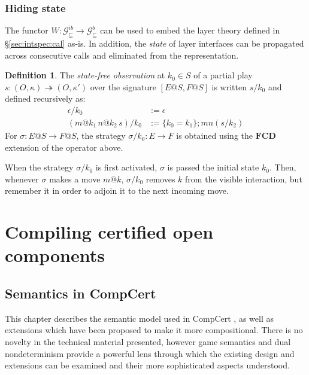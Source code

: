 \documentclass[11pt,oneside,draft]{book}
\theoremstyle{definition}
\newtheorem{definition}[theorem]{Definition}
\newcommand{\gcat}{\mathcal{G}_{\sqsubseteq}}
\begin{document}
\section{Hiding state} \label{sec:gamesem:pack} %

The functor
$W : \gcat^{ib} \rightarrow \gcat^b$
can be used to embed the layer theory
defined in \S\ref{sec:intspec:cal} as-is.
In addition, the \emph{state} of layer interfaces
can be propagated across consecutive calls and
eliminated from the representation.

\begin{definition}
The \emph{state-free observation} at $k_0 \in S$
of a partial play
$s : (O, \kappa) \twoheadrightarrow (O, \kappa')$
over the signature $[E@S, F@S]$
is written $s/k_0$ and defined recursively as:
\begin{align*}
    \epsilon / k_0 &:= \epsilon \\
    (m@k_1 \, n@k_2 \, s) / k_0 &:=
      \{ k_0 = k_1 \} ; m n (s / k_2)
\end{align*}
For $\sigma : E@S \rightarrow F@S$,
the strategy $\sigma / k_0 : E \rightarrow F$
is obtained using the $\mathbf{FCD}$ extension
of the operator above.
\end{definition}

When the strategy $\sigma / k_0$ is first activated,
$\sigma$ is passed the initial state $k_0$.
Then, whenever $\sigma$ makes a move $m@k$,
$\sigma / k_0$ removes $k$ from the visible interaction,
but remember it in order to adjoin it to the next incoming move.



\part{Compiling certified open components} \label{part:compcerto}

\chapter{Semantics in CompCert} \label{sec:compcert-sem} %

This chapter describes the semantic model
used in CompCert \citep{compcert},
as well as extensions which have been proposed
to make it more compositional.
There is no novelty in the technical material presented,
however
game semantics and dual nondeterminism
provide a powerful lens
through which the existing design and extensions
can be examined
and their more sophisticated aspects understood.
\end{document}
